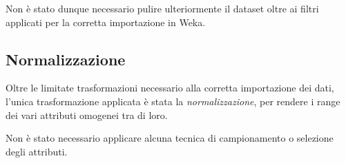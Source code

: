 Non è stato dunque necessario pulire ulteriormente il dataset oltre ai filtri applicati per la corretta importazione in Weka.

\subsection{Normalizzazione}

Oltre le limitate trasformazioni necessario alla corretta importazione dei dati, l'unica trasformazione applicata è stata la \emph{normalizzazione},
per rendere i range dei vari attributi omogenei tra di loro.


Non è stato necessario applicare  alcuna tecnica di campionamento o selezione degli attributi.
